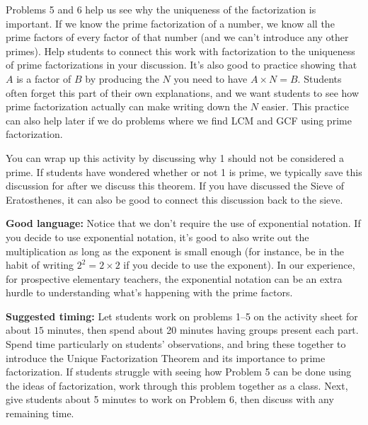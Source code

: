 \documentclass[noauthor, nooutcomes]{ximera}
\begin{document}
\begin{instructorNotes}
Problems 5 and 6 help us see why the uniqueness of the factorization is important. If we know the prime factorization of a number, we know all the prime factors of every factor of that number (and we can't introduce any other primes). Help students to connect this work with factorization to the uniqueness of prime factorizations in your discussion. It's also good to practice showing that $A$ is a factor of $B$ by producing the $N$ you need to have $A \times N = B$. Students often forget this part of their own explanations, and we want students to see how prime factorization actually can make writing down the $N$ easier. This practice can also help later if we do problems where we find LCM and GCF using prime factorization.


You can wrap up this activity by discussing why 1 should not be considered a prime.  If students have wondered whether or not 1 is prime, we typically save this discussion for after we discuss this theorem. If you have discussed the Sieve of Eratosthenes, it can also be good to connect this discussion back to the sieve.

{\bf Good language:} Notice that we don't require the use of exponential notation. If you decide to use exponential notation, it's good to also write out the multiplication as long as the exponent is small enough (for instance, be in the habit of writing $2^2 = 2 \times 2$ if you decide to use the exponent). In our experience, for prospective elementary teachers, the exponential notation can be an extra hurdle to understanding what's happening with the prime factors.




{\bf Suggested timing: }  Let students work on problems 1--5 on the activity sheet for about $15$ minutes, then spend about 20 minutes having groups present each part. Spend time particularly on students' observations, and bring these together to introduce the Unique Factorization Theorem and its importance to prime factorization. If students struggle with seeing how Problem 5 can be done using the ideas of factorization, work through this problem together as a class. Next, give students about 5 minutes to work on Problem 6, then discuss with any remaining time.


\end{instructorNotes}
\end{document}
